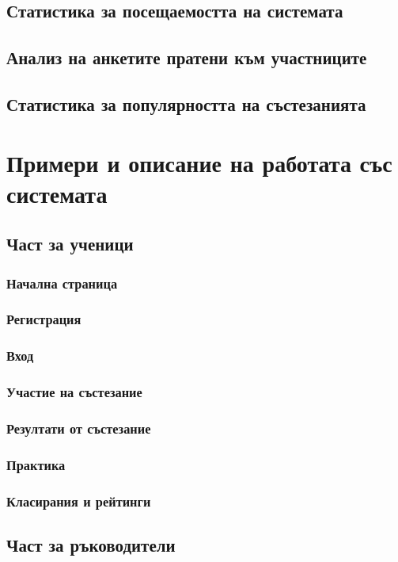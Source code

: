 \documentclass[a4paper,12pt]{article}
\begin{document}
  \subsection{Статистика за посещаемостта на системата}
  \subsection{Анализ на анкетите пратени към участниците}
  \subsection{Статистика за популярността на състезанията}
  \section{Примери и описание на работата със системата}
  \subsection{Част за ученици}
  \subsubsection{Начална страница}
  \subsubsection{Регистрация}
  \subsubsection{Вход}
  \subsubsection{Участие на състезание}
  \subsubsection{Резултати от състезание}
  \subsubsection{Практика}
  \subsubsection{Класирания и рейтинги}
  \subsection{Част за ръководители}
\end{document}
